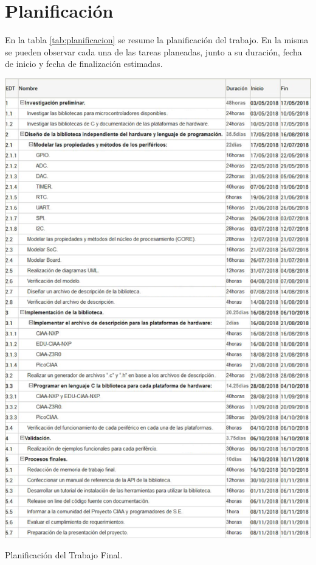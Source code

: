 \section{Planificación}
\label{sec:planificacion}

En la tabla \ref{tab:planificacion} se resume la planificación del trabajo. En la misma se pueden observar cada una de las tareas planeadas, junto a su duración, fecha de inicio y fecha de finalización estimadas.

\begin{table}[!htbp]
\centering
\includegraphics*[width=16cm]{Figures/GanttSP.png}
\par\caption{Planificación del Trabajo Final.}\label{tab:planificacion}
\end{table}